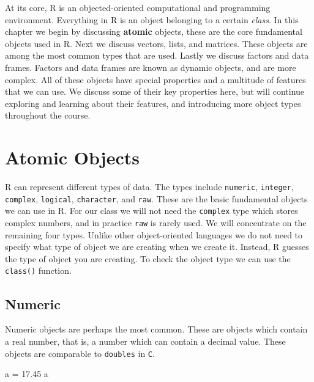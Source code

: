 \documentclass[
]{book}
\newenvironment{Shaded}{\begin{snugshade}}{\end{snugshade}}
\newcommand{\FloatTok}[1]{\textcolor[rgb]{0.00,0.00,0.81}{#1}}
\newcommand{\NormalTok}[1]{#1}
\newcommand{\StringTok}[1]{\textcolor[rgb]{0.31,0.60,0.02}{#1}}
\begin{document}
At its core, R is an objected-oriented computational and programming environment. Everything in R is an object belonging to a certain \emph{class}. In this chapter we begin by discussing \textbf{atomic} objects, these are the core fundamental objects used in R. Next we discuss vectors, lists, and matrices. These objects are among the most common types that are used. Lastly we discuss factors and data frames. Factors and data frames are known as dynamic objects, and are more complex. All of these objects have special properties and a multitude of features that we can use. We discuss some of their key properties here, but will continue exploring and learning about their features, and introducing more object types throughout the course.

\hypertarget{atomic-objects}{%
\section{Atomic Objects}\label{atomic-objects}}

R can represent different types of data. The types include \texttt{numeric}, \texttt{integer}, \texttt{complex}, \texttt{logical}, \texttt{character}, and \texttt{raw}. These are the basic fundamental objects we can use in R. For our class we will not need the \texttt{complex} type which stores complex numbers, and in practice \texttt{raw} is rarely used. We will concentrate on the remaining four types. Unlike other object-oriented languages we do not need to specify what type of object we are creating when we create it. Instead, R guesses the type of object you are creating. To check the object type we can use the \texttt{class()} function.

\hypertarget{numeric}{%
\subsection*{Numeric}\label{numeric}}

Numeric objects are perhaps the most common. These are objects which contain a real number, that is, a number which can contain a decimal value. These objects are comparable to \texttt{doubles} in \texttt{C}.

\begin{Shaded}
\begin{Highlighting}[]
\NormalTok{a =}\StringTok{ }\FloatTok{17.45}
\NormalTok{a}
\end{Highlighting}
\end{Shaded}
\end{document}
